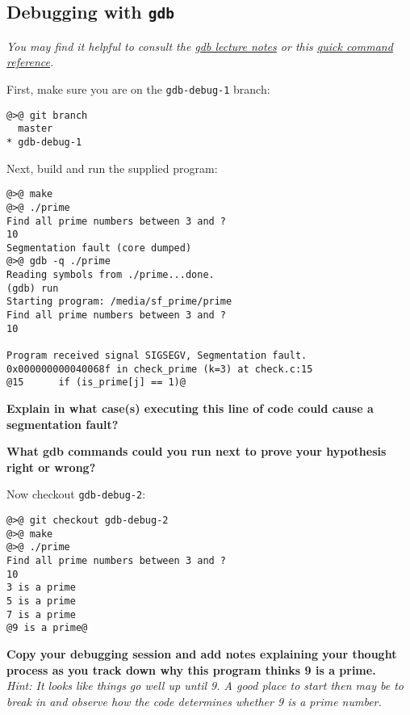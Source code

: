 \documentclass{article}
\begin{document}
\subsection{Debugging with \texttt{gdb}}

\emph{You may find it helpful to consult the
  \href{https://c4cs.github.io/lectures/w18/week11}{gdb lecture notes}
  or this
  \href{https://ccrma.stanford.edu/~jos/stkintro/Useful_commands_gdb.html}
  {quick command reference}.
}



First, make sure you are on the \texttt{gdb-debug-1} branch:
\begin{lstlisting}
@>@ git branch
  master
* gdb-debug-1
\end{lstlisting}

Next, build and run the supplied program:
\begin{lstlisting}
@>@ make
@>@ ./prime
Find all prime numbers between 3 and ?
10
Segmentation fault (core dumped)
@>@ gdb -q ./prime
Reading symbols from ./prime...done.
(gdb) run
Starting program: /media/sf_prime/prime 
Find all prime numbers between 3 and ?
10

Program received signal SIGSEGV, Segmentation fault.
0x000000000040068f in check_prime (k=3) at check.c:15
@15      if (is_prime[j] == 1)@
\end{lstlisting}

\textbf{Explain in what case(s) executing this line of code could cause a
  segmentation fault?}
\vspace{3cm}

\textbf{What gdb commands could you run next to prove your hypothesis right or
  wrong?}
\vspace{3cm}


\newpage
Now checkout \texttt{gdb-debug-2}:
\begin{lstlisting}
@>@ git checkout gdb-debug-2
@>@ make
@>@ ./prime
Find all prime numbers between 3 and ?
10
3 is a prime
5 is a prime
7 is a prime
@9 is a prime@
\end{lstlisting}
\textbf{Copy your debugging session and add notes explaining your
  thought process as you track down why this program thinks 9 is a prime.}\\
\emph{\small Hint: It looks like things go well up until 9. A good place to
  start then may be to break in and observe how the code determines whether 9
  is a prime number.}
\end{document}
